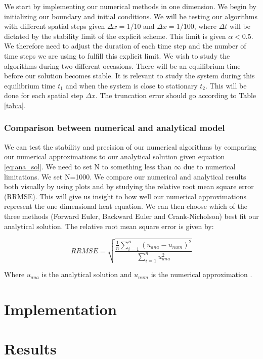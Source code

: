 \documentclass{article}
\begin{document}
\begin{multicols}{2}
We start by implementing our numerical methods in one dimension. We begin by initializing our boundary and initial conditions. We will be testing our algorithms with different spatial steps given $\Delta x =1/10$ and $\Delta x = 1/100$, where $\Delta t$ will be dictated by the stability limit of the explicit scheme. This limit is given $\alpha<0.5$. We therefore need to adjust the duration of each time step and the number of time steps we are using to fulfill this explicit limit. We wish to study the algorithms during two different occasions. There will be an equilibrium time before our solution becomes stable. It is relevant to study the system during this equilibrium time $t_1$ and when the system is close to stationary $t_2$. This will be done for each spatial step $\Delta x$. The truncation error should go according to Table \ref{tab:a}.

\subsubsection{Comparison between numerical and analytical model}

We can test the stability and precision of our numerical algorithms by comparing our numerical approximations to our analytical solution given equation \ref{eq:ana_sol}. We need to set N to something less than $\infty$ due to numerical limitations. We set N=1000. We compare our numerical and analytical results both visually by using plots and by studying the relative root mean square error (RRMSE). This will give us insight to how well our numerical approximations represent the one dimensional heat equation. We can then choose which of the three methods (Forward Euler, Backward Euler and Crank-Nicholson) best fit our analytical solution. The relative root mean square error is given by:

\begin{equation}
RRMSE = \sqrt{\frac{\frac{1}{n}\sum_{i=1}^n(u_{ana}-u_{num})^2}{\sum_{i=1}^n u_{ana}^2}}
\end{equation}

Where $u_{ana}$ is the analytical solution and $u_{num}$ is the numerical approximation \cite{97}.

\section{Implementation}


\section{Results}


\end{multicols}
\end{document}
